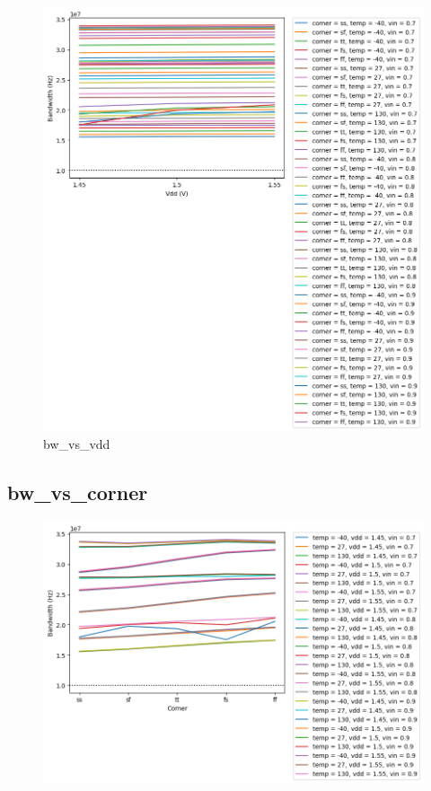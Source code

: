 \documentclass[
  a4paper,
  DIV=11,
  numbers=noendperiod]{scrartcl}
\begin{document}
\begin{tcolorbox}
\begin{figure}[H]
{\centering \includegraphics{./cace/_docs/ota-5t/schematic/bw_vs_vdd.png}

}

\caption{bw\_vs\_vdd}

\end{figure}%

\subsection*{bw\_vs\_corner}\label{bw_vs_corner}

\begin{figure}[H]

{\centering \includegraphics{./cace/_docs/ota-5t/schematic/bw_vs_corner.png}

}
\end{figure}
\end{tcolorbox}
\end{document}
